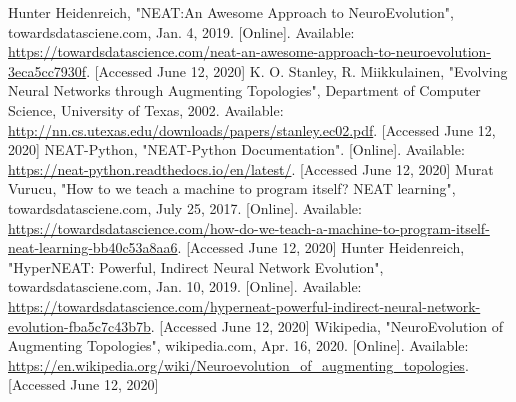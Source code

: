 \documentclass[conference]{IEEEtran}
\begin{document}
\begin{thebibliography}{00}
 Hunter Heidenreich, "NEAT:An Awesome Approach to NeuroEvolution", towardsdatasciene.com, Jan. 4, 2019. [Online]. Available: \url{https://towardsdatascience.com/neat-an-awesome-approach-to-neuroevolution-3eca5cc7930f}. [Accessed June 12, 2020]
 K. O. Stanley, R. Miikkulainen, "Evolving Neural Networks through Augmenting Topologies", Department of Computer Science, University of Texas, 2002. Available: \url{http://nn.cs.utexas.edu/downloads/papers/stanley.ec02.pdf}. [Accessed June 12, 2020]
 NEAT-Python, "NEAT-Python Documentation". [Online]. Available: \url{https://neat-python.readthedocs.io/en/latest/}. [Accessed June 12, 2020]
 Murat Vurucu, "How to we teach a machine to program itself? NEAT learning", towardsdatasciene.com, July 25, 2017. [Online]. Available: \url{https://towardsdatascience.com/how-do-we-teach-a-machine-to-program-itself-neat-learning-bb40c53a8aa6}. [Accessed June 12, 2020]
 Hunter Heidenreich, "HyperNEAT: Powerful, Indirect Neural Network Evolution", towardsdatasciene.com, Jan. 10, 2019. [Online]. Available: \url{https://towardsdatascience.com/hyperneat-powerful-indirect-neural-network-evolution-fba5c7c43b7b}. [Accessed June 12, 2020]
 Wikipedia, "NeuroEvolution of Augmenting Topologies", wikipedia.com, Apr. 16, 2020. [Online]. Available: \url{https://en.wikipedia.org/wiki/Neuroevolution_of_augmenting_topologies}. [Accessed June 12, 2020]
\end{thebibliography}
\end{document}

